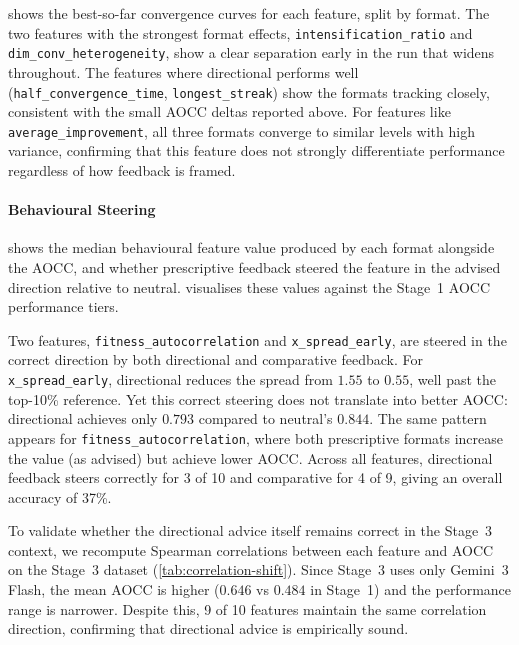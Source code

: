  shows the best-so-far convergence curves for each feature, split by format. The two features with the strongest format effects, \texttt{intensification\_ratio} and \texttt{dim\_conv\_heterogeneity}, show a clear separation early in the run that widens throughout. The features where directional performs well (\texttt{half\_convergence\_time}, \texttt{longest\_streak}) show the formats tracking closely, consistent with the small AOCC deltas reported above. For features like \texttt{average\_improvement}, all three formats converge to similar levels with high variance, confirming that this feature does not strongly differentiate performance regardless of how feedback is framed.

\paragraph{Behavioural Steering}
\label{sec:results-steering}

 shows the median behavioural feature value produced by each format alongside the AOCC, and whether prescriptive feedback steered the feature in the advised direction relative to neutral.  visualises these values against the Stage~1 AOCC performance tiers.

Two features, \texttt{fitness\_autocorrelation} and \texttt{x\_spread\_early}, are steered in the correct direction by both directional and comparative feedback. For \texttt{x\_spread\_early}, directional reduces the spread from $1.55$ to $0.55$, well past the top-10\% reference. Yet this correct steering does not translate into better AOCC: directional achieves only $0.793$ compared to neutral's $0.844$. The same pattern appears for \texttt{fitness\_autocorrelation}, where both prescriptive formats increase the value (as advised) but achieve lower AOCC. Across all features, directional feedback steers correctly for 3 of 10 and comparative for 4 of 9, giving an overall accuracy of 37\%.

To validate whether the directional advice itself remains correct in the Stage~3 context, we recompute Spearman correlations between each feature and AOCC on the Stage~3 dataset (\cref{tab:correlation-shift}). Since Stage~3 uses only Gemini~3 Flash, the mean AOCC is higher ($0.646$ vs $0.484$ in Stage~1) and the performance range is narrower. Despite this, 9 of 10 features maintain the same correlation direction, confirming that directional advice is empirically sound.

